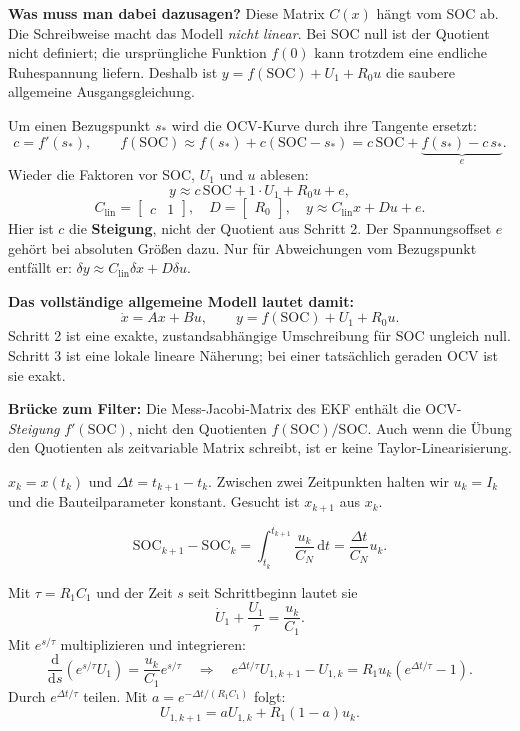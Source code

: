 \textbf{Was muss man dabei dazusagen?} Diese Matrix $C(x)$ hängt vom SOC ab. Die Schreibweise macht das Modell \emph{nicht linear}. Bei SOC null ist der Quotient nicht definiert; die ursprüngliche Funktion $f(0)$ kann trotzdem eine endliche Ruhespannung liefern. Deshalb ist $y=f(\mathrm{SOC})+U_1+R_0u$ die saubere allgemeine Ausgangsgleichung.

Um einen Bezugspunkt $s_\ast$ wird die OCV-Kurve durch ihre Tangente ersetzt:
\[
c=f'(s_\ast),\qquad
f(\mathrm{SOC})\approx f(s_\ast)+c(\mathrm{SOC}-s_\ast)
=c\,\mathrm{SOC}+\underbrace{f(s_\ast)-c\,s_\ast}_{e}.
\]
Wieder die Faktoren vor SOC, $U_1$ und $u$ ablesen:
\[
y\approx c\,\mathrm{SOC}+1\cdot U_1+R_0u+e,
\]
\[
\boxed{C_{\mathrm{lin}}=\begin{bmatrix}c&1\end{bmatrix}},\quad
\boxed{D=\begin{bmatrix}R_0\end{bmatrix}},\quad
\boxed{y\approx C_{\mathrm{lin}}x+Du+e}.
\]
Hier ist $c$ die \textbf{Steigung}, nicht der Quotient aus Schritt 2. Der Spannungsoffset $e$ gehört bei absoluten Größen dazu. Nur für Abweichungen vom Bezugspunkt entfällt er: $\delta y\approx C_{\mathrm{lin}}\delta x+D\delta u$.

\textbf{Das vollständige allgemeine Modell lautet damit:}
\[
\boxed{\dot x=Ax+Bu,\qquad y=f(\mathrm{SOC})+U_1+R_0u.}
\]
Schritt 2 ist eine exakte, zustandsabhängige Umschreibung für SOC ungleich null. Schritt 3 ist eine lokale lineare Näherung; bei einer tatsächlich geraden OCV ist sie exakt.

\textbf{Brücke zum Filter:} Die Mess-Jacobi-Matrix des EKF enthält die OCV-\emph{Steigung} $f'(\mathrm{SOC})$, nicht den Quotienten $f(\mathrm{SOC})/\mathrm{SOC}$. Auch wenn die Übung den Quotienten als zeitvariable Matrix schreibt, ist er keine Taylor-Linearisierung.

$x_k=x(t_k)$ und $\Delta t=t_{k+1}-t_k$. Zwischen zwei Zeitpunkten halten wir $u_k=I_k$ und die Bauteilparameter konstant. Gesucht ist $x_{k+1}$ aus $x_k$.

\[
\mathrm{SOC}_{k+1}-\mathrm{SOC}_k=\int_{t_k}^{t_{k+1}}\frac{u_k}{C_N}\,\mathrm dt
=\frac{\Delta t}{C_N}u_k.
\]

Mit $\tau=R_1C_1$ und der Zeit $s$ seit Schrittbeginn lautet sie
\[
\dot U_1+\frac{U_1}{\tau}=\frac{u_k}{C_1}.
\]
Mit $e^{s/\tau}$ multiplizieren und integrieren:
\[
\frac{\mathrm d}{\mathrm ds}(e^{s/\tau}U_1)=\frac{u_k}{C_1}e^{s/\tau}
\quad\Longrightarrow\quad
 e^{\Delta t/\tau}U_{1,k+1}-U_{1,k}=R_1u_k(e^{\Delta t/\tau}-1).
\]
Durch $e^{\Delta t/\tau}$ teilen. Mit $a=e^{-\Delta t/(R_1C_1)}$ folgt:
\[
\boxed{U_{1,k+1}=aU_{1,k}+R_1(1-a)u_k.}
\]

